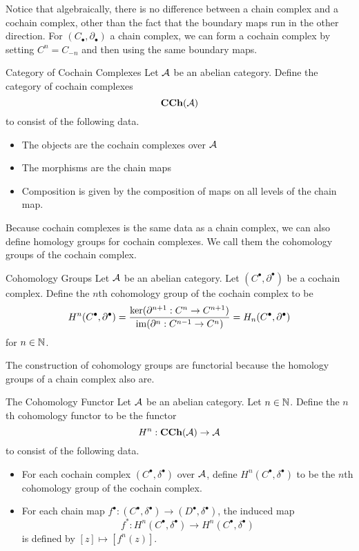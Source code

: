 \documentclass[a4paper]{article}
\begin{document}
Notice that algebraically, there is no difference between a chain complex and a cochain complex, other than the fact that the boundary maps run in the other direction. For $(C_\bullet,\partial_\bullet)$ a chain complex, we can form a cochain complex by setting $C^n=C_{-n}$ and then using the same boundary maps. 

\begin{defn}{Category of Cochain Complexes}{} Let $\mathcal{A}$ be an abelian category. Define the category of cochain complexes $$\bold{CCh}(\mathcal{A})$$ to consist of the following data. 
\begin{itemize}
\item The objects are the cochain complexes over $\mathcal{A}$
\item The morphisms are the chain maps
\item Composition is given by the composition of maps on all levels of the chain map. 
\end{itemize}
\end{defn}

Because cochain complexes is the same data as a chain complex, we can also define homology groups for cochain complexes. We call them the cohomology groups of the cochain complex. 

\begin{defn}{Cohomology Groups}{} Let $\mathcal{A}$ be an abelian category. Let $(C^\bullet,\partial^\bullet)$ be a cochain complex. Define the $n$th cohomology group of the cochain complex to be $$H^n(C^\bullet,\partial^\bullet)=\frac{\ker(\partial^{n+1}:C^n\to C^{n+1})}{\operatorname{im}(\partial^n:C^{n-1}\to C^n)}=H_n(C^\bullet,\partial^\bullet)$$ for $n\in\mathbb{N}$. 
\end{defn}

The construction of cohomology groups are functorial because the homology groups of a chain complex also are. 

\begin{defn}{The Cohomology Functor}{} Let $\mathcal{A}$ be an abelian category. Let $n\in\mathbb{N}$. Define the $n$th cohomology functor to be the functor $$H^n:\bold{CCh}(\mathcal{A})\to\mathcal{A}$$ to consist of the following data. 
\begin{itemize}
\item For each cochain complex $(C^\bullet,\delta^\bullet)$ over $\mathcal{A}$, define $H^n(C^\bullet,\delta^\bullet)$ to be the $n$th cohomology group of the cochain complex. 
\item For each chain map $f^\bullet:(C^\bullet,\delta^\bullet)\to(D^\bullet,\delta^\bullet)$, the induced map $$f^\ast:H^n(C^\bullet,\delta^\bullet)\to H^n(C^\bullet,\delta^\bullet)$$ is defined by $[z]\mapsto[f^n(z)]$. 
\end{itemize}
\end{defn}
\end{document}
